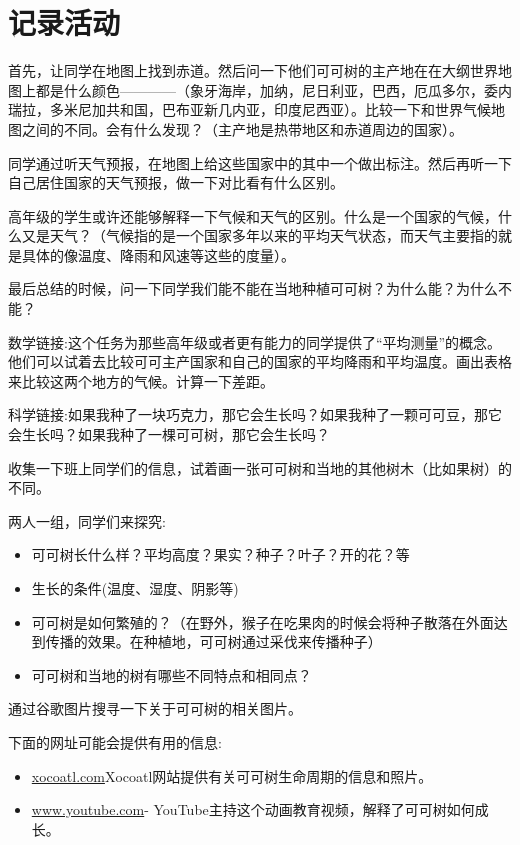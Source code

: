 \section{记录活动}
    首先，让同学在地图上找到赤道。然后问一下他们可可树的主产地在在大纲世界地图上都是什么颜色————（象牙海岸，加纳，尼日利亚，巴西，厄瓜多尔，委内瑞拉，多米尼加共和国，巴布亚新几内亚，印度尼西亚）。比较一下和世界气候地图之间的不同。会有什么发现？（主产地是热带地区和赤道周边的国家）。\par
    同学通过听天气预报，在地图上给这些国家中的其中一个做出标注。然后再听一下自己居住国家的天气预报，做一下对比看有什么区别。\par
    高年级的学生或许还能够解释一下气候和天气的区别。什么是一个国家的气候，什么又是天气？（气候指的是一个国家多年以来的平均天气状态，而天气主要指的就是具体的像温度、降雨和风速等这些的度量）。\par
    最后总结的时候，问一下同学我们能不能在当地种植可可树？为什么能？为什么不能？\par
    数学链接:这个任务为那些高年级或者更有能力的同学提供了“平均测量”的概念。他们可以试着去比较可可主产国家和自己的国家的平均降雨和平均温度。画出表格来比较这两个地方的气候。计算一下差距。\par
    科学链接:如果我种了一块巧克力，那它会生长吗？如果我种了一颗可可豆，那它会生长吗？如果我种了一棵可可树，那它会生长吗？\par
    收集一下班上同学们的信息，试着画一张可可树和当地的其他树木（比如果树）的不同。\par
    两人一组，同学们来探究:\par
    \begin{itemize}
      \item 可可树长什么样？平均高度？果实？种子？叶子？开的花？等
      \item 生长的条件(温度、湿度、阴影等)
      \item 可可树是如何繁殖的？（在野外，猴子在吃果肉的时候会将种子散落在外面达到传播的效果。在种植地，可可树通过采伐来传播种子）  
      \item 可可树和当地的树有哪些不同特点和相同点？
    \end{itemize}  
    通过谷歌图片搜寻一下关于可可树的相关图片。\par
    下面的网址可能会提供有用的信息:\par
    \begin{itemize}
      \item \href{http://www.xocoatl.org/tree.htm}{xocoatl.com}Xocoatl网站提供有关可可树生命周期的信息和照片。
      \item \href{https://www.youtube.com/watch?v=LJ-1snuKJ7o}{www.youtube.com}- YouTube主持这个动画教育视频，解释了可可树如何成长。
    \end{itemize}  
